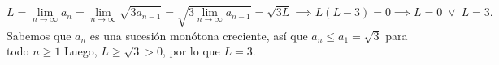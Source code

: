 \begin{frame}
\begin{solution}
\begin{description}
                \begin{equation*}
                    L=
                    \lim\limits_{n\to\infty}a_{n}=
                    \lim\limits_{n\to\infty}\sqrt{3a_{n-1}}=
                    \sqrt{3\lim\limits_{n\to\infty}a_{n-1}}=
                    \sqrt{3L}
                    \implies
                    L\left(L-3\right)=0
                    \implies
                    L=0 \;\vee\; L=3.
                \end{equation*}
                Sabemos que $a_{n}$ es una sucesión monótona
                creciente, así que $a_{n}\leq a_{1}=\sqrt{3}$ para
                todo $n\geq1$
                Luego, $L\geq\sqrt{3}>0$, por lo que $L=3$.
        \end{description}
    \end{solution}
\end{frame}


